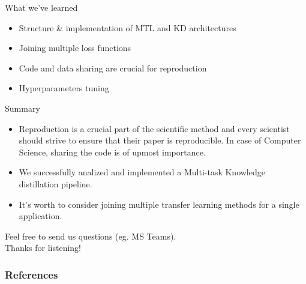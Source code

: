 \documentclass [xcolor=svgnames, t] {beamer}
\begin{document}
\begin{frame}{What we've learned}
\begin{itemize}
    \item Structure \& implementation of MTL and KD architectures
    \item Joining multiple loss functions
    \item Code and data sharing are crucial for reproduction
    \item Hyperparameters tuning
\end{itemize}
\end{frame}
    

\begin{frame}{Summary}
    \centering
    \begin{itemize}
    \item Reproduction is a crucial part of the scientific method and every scientist should strive to ensure that their paper is reproducible. In case of Computer Science, sharing the code is of upmost importance.
    \item We successfully analized and implemented a Multi-task Knowledge distillation pipeline.
    \item It's worth to consider joining multiple transfer learning methods for a single application.
    \end{itemize}
    \vspace{7mm}
    Feel free to send us questions (eg. MS Teams).\\ Thanks for listening!
\end{frame}
    

\begin{frame} [allowframebreaks]\frametitle{References}


\end{frame}
\end{document}
